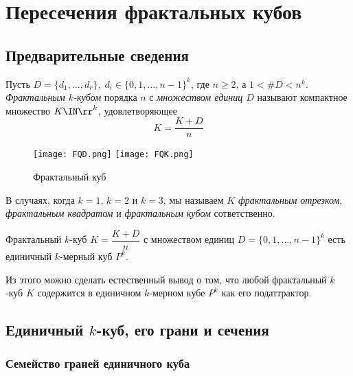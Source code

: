 \newpage
\chapter{Пересечения фрактальных кубов}


\section{Предварительные сведения}

\begin{definition}
Пусть  $D=\{d_1,\ldots,d_r\},\; d_i\in\{0,1,\ldots,n-1\}^k$, где $n\ge 2$, а $1<\#D<n^k$.\\
{\em Фрактальным $k$-кубом} порядка $n$ с {\em множеством единиц $D$} называют компактное множество $K\IN\rr^k$, удовлетворяющее $$K=\dfrac{K+D}{n}$$
\end{definition}

\begin{figure}[H]
    \centering
    \texttt{[image: FQD.png]}
    \hfill
    \texttt{[image: FQK.png]}
    \caption{Фрактальный куб}
\end{figure}

В случаях, когда $k=1$, $k=2$ и $k=3$, мы называем $K$  \emph{фрактальным отрезком}, \emph{фрактальным квадратом} и \emph{фрактальным кубом} сответственно.

\begin{remark}
Фрактальный $k$-куб $K=\dfrac{K+D}{n}$ с множеством единиц $D=\{0,1,\ldots,n-1\}^k$ есть единичный $k$-мерный куб $P^k$.
\end{remark}

Из этого можно сделать естественный вывод о том, что любой фрактальный $k$-куб $K$ содержится в единичном $k$-мерном кубе $P^k$ как его податтрактор.
 


\section{Единичный $k$-куб, его грани и сечения} 
 
\subsection{Семейство граней единичного куба} 

